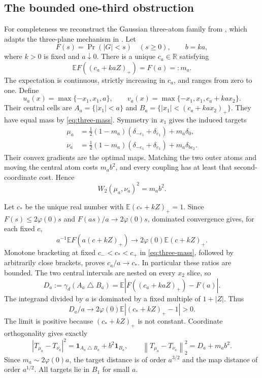\documentclass[11pt]{article}
\numberwithin{equation}{section}
\theoremstyle{remark}\newtheorem{remark}[theorem]{Remark}
\newcommand{\R}{\mathbb R}\newcommand{\E}{\mathbb E}
\newcommand{\ind}{\mathbf 1}\newcommand{\norm}[1]{\left\lVert#1\right\rVert}
\begin{document}
\subsection{The bounded one-third obstruction}
For completeness we reconstruct the Gaussian three-atom family from \cite[Theorem~1.3]{ManuscriptV3}, which adapts the three-plane mechanism in \cite{OpenAI2026}.
Let
\[
 F(s)=\Pr(|G|<s)\quad(s\ge0),\qquad b=ka,
\]
where $k>0$ is fixed and $a\downarrow0$. There is a unique $c_a\in\R$ satisfying
\begin{equation}\label{eq:three-mass}
 \E F((c_a+kaZ)_+)=F(a)=:m_a.
\end{equation}
The expectation is continuous, strictly increasing in $c_a$, and ranges from zero to one. Define
\[
 u_a(x)=\max\{-x_1,x_1,a\},\qquad
 v_a(x)=\max\{-x_1,x_1,c_a+ka x_2\}.
\]
Their central cells are $A_a=\{|x_1|<a\}$ and
$B_a=\{|x_1|<(c_a+ka x_2)_+\}$. They have equal mass by \eqref{eq:three-mass}. Symmetry in $x_1$ gives the induced targets
\begin{align*}
 \mu_a&=\tfrac12(1-m_a)(\delta_{-e_1}+\delta_{e_1})+m_a\delta_0,\\
 \nu_a&=\tfrac12(1-m_a)(\delta_{-e_1}+\delta_{e_1})+m_a\delta_{be_2}.
\end{align*}
Their convex gradients are the optimal maps. Matching the two outer atoms and moving the central atom costs $m_ab^2$, and every coupling has at least that second-coordinate cost. Hence
\begin{equation}\label{eq:three-W}
 W_2(\mu_a,\nu_a)^2=m_ab^2.
\end{equation}

Let $c_*$ be the unique real number with $\E(c_*+kZ)_+=1$. Since $F(s)\le2\varphi(0)s$ and $F(as)/a\to2\varphi(0)s$, dominated convergence gives, for each fixed $c$,
\[
 a^{-1}\E F(a(c+kZ)_+)\longrightarrow2\varphi(0)\E(c+kZ)_+.
\]
Monotone bracketing at fixed $c_-<c_*<c_+$ in \eqref{eq:three-mass}, followed by arbitrarily close brackets, proves $c_a/a\to c_*$. In particular these ratios are bounded. The two central intervals are nested on every $x_2$ slice, so
\[
 D_a:=\gamma_d(A_a\mathbin\triangle B_a)
 =\E|F((c_a+kaZ)_+)-F(a)|.
\]
The integrand divided by $a$ is dominated by a fixed multiple of $1+|Z|$. Thus
\[
 D_a/a\longrightarrow2\varphi(0)\E|(c_*+kZ)_+-1|>0.
\]
The limit is positive because $(c_*+kZ)_+$ is not constant. Coordinate orthogonality gives exactly
\[
 |T_{\mu_a}-T_{\nu_a}|^2
 =\ind_{A_a\mathbin\triangle B_a}+b^2\ind_{B_a},
 \qquad \norm{T_{\mu_a}-T_{\nu_a}}_2^2=D_a+m_ab^2.
\]
Since $m_a\sim2\varphi(0)a$, the target distance is of order $a^{3/2}$ and the map distance of order $a^{1/2}$. All targets lie in $B_1$ for small $a$.
\end{document}
